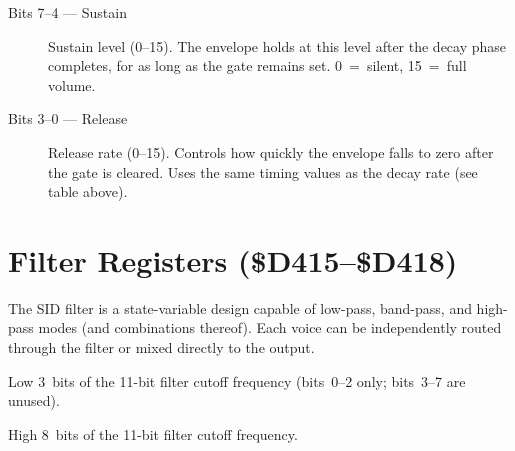 


\begin{description}
  \item[Bits 7--4 --- Sustain] Sustain level (0--15).  The envelope holds at
        this level after the decay phase completes, for as long as the gate
        remains set.  0~=~silent, 15~=~full volume.
  \item[Bits 3--0 --- Release] Release rate (0--15).  Controls how quickly the
        envelope falls to zero after the gate is cleared.  Uses the same
        timing values as the decay rate (see table above).
\end{description}


\section{Filter Registers (\$D415--\$D418)}
\label{sec:sid-filter}

The SID filter is a state-variable design capable of low-pass, band-pass,
and high-pass modes (and combinations thereof).  Each voice can be
independently routed through the filter or mixed directly to the output.



Low 3~bits of the 11-bit filter cutoff frequency (bits~0--2 only; bits~3--7
are unused).



High 8~bits of the 11-bit filter cutoff frequency.




